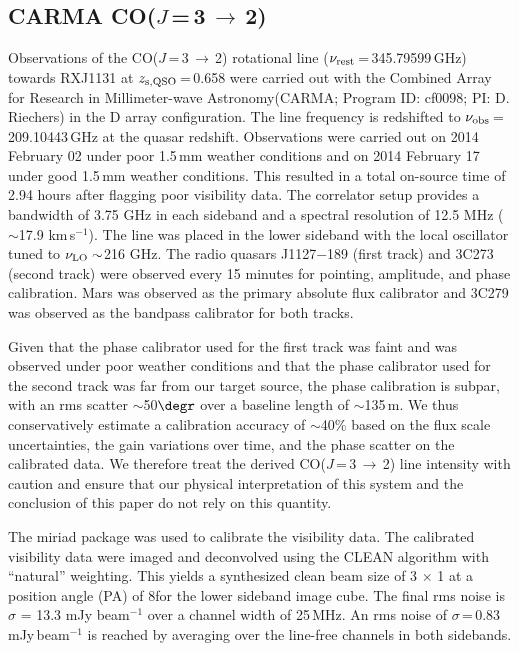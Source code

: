 \documentclass[]{emulateapj}
\newcommand{\rarr}{$\rightarrow$}
\newcommand{\cco}{\mbox{CO($J$\,=\,3\,\rarr\,2)}\xspace}
\newcommand{\kms}{\mbox{km\,s$^{-1}$}\xspace}
\newcommand{\pmOne}{\mbox{$^{-1}$}\xspace}
\newcommand{\eq}{\,=\,}
\def\carma    {Combined Array for Research in Millimeter-wave Astronomy\xspace}
\newcommand{\ncode}[1]{{\sc #1}}
\begin{document}
\subsection{CARMA \cco}
Observations of the \cco rotational line
($\nu_{\rm rest}$\,=\,345.79599\,GHz) towards RXJ1131 at $z_{\rm s, QSO}$\eq0.658
were carried out with the \carma (CARMA;
Program ID: cf0098; PI: D. Riechers) in the D array configuration.
The line frequency is redshifted to $\nu_{\rm obs}$\eq209.10443\,GHz at the quasar redshift.
Observations were carried out
on 2014 February 02 under poor 1.5\,mm
weather conditions and on 2014 February 17 under good 1.5\,mm
weather conditions.
This resulted in a
total on-source time of 2.94 hours after flagging poor
visibility data.
The correlator setup provides a bandwidth of 3.75 GHz in
each sideband and a
spectral resolution of 12.5 MHz ($\sim$17.9 \kms). The
line was placed in the lower sideband with the local oscillator tuned to $\nu_{\rm LO}\sim$216 GHz. The radio quasars J1127$-$189 (first track) and 3C273
(second track) were observed
every 15 minutes for pointing, amplitude, and phase calibration. Mars was
observed as the primary absolute flux calibrator and 3C279 was observed as
the bandpass calibrator for both tracks.

Given that the phase calibrator used for the first track was faint and was
observed under poor weather conditions and that the phase calibrator used for
the second track was far from our target source, the phase calibration is
subpar, with an rms scatter $\sim$50$\degr$ over a baseline length of $\sim$135\,m.
We thus conservatively estimate
a calibration accuracy of $\sim$40\% based on the flux scale uncertainties,
the gain variations over time, and the phase scatter on the calibrated data. We
therefore treat the derived \cco line intensity with caution and ensure that our physical interpretation
of this system and the conclusion of this paper do not rely on this quantity.

The \ncode{miriad} package was used to calibrate the visibility data.
The calibrated visibility data were
imaged and deconvolved using the CLEAN algorithm with ``natural'' weighting. This yields a synthesized clean
beam size of 3 $\times$ 1 at a position angle (PA) of 8\degr for the lower sideband
image cube. The final rms noise is $\sigma$ = 13.3 mJy beam$^{-1}$
over a channel width of 25\,MHz. An rms noise of
$\sigma$\,=\,0.83\,mJy\,beam\pmOne is reached by averaging over the
line-free channels in both sidebands.
\end{document}
